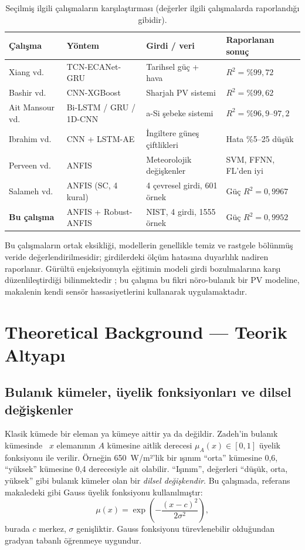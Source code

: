 \documentclass[11pt,a4paper]{article}
\begin{document}
\begin{table}[H]
\centering\small
\caption{Seçilmiş ilgili çalışmaların karşılaştırması (değerler ilgili çalışmalarda raporlandığı gibidir).}
\label{tab:related}
\begin{tabular}{@{}llll@{}}
\toprule
Çalışma & Yöntem & Girdi / veri & Raporlanan sonuç \\
\midrule
Xiang vd.~\cite{xiang2024} & TCN-ECANet-GRU & Tarihsel güç + hava & $R^2=\%99{,}72$ \\
Bashir vd.~\cite{bashir2024} & CNN-XGBoost & Sharjah PV sistemi & $R^2=\%99{,}62$ \\
Ait Mansour vd.~\cite{aitmansour2024} & Bi-LSTM / GRU / 1D-CNN & a-Si şebeke sistemi & $R^2=\%96{,}9$–$97{,}2$ \\
Ibrahim vd.~\cite{ibrahim2024} & CNN + LSTM-AE & İngiltere güneş çiftlikleri & Hata \%5–25 düşük \\
Perveen vd.~\cite{perveen2019} & ANFIS & Meteorolojik değişkenler & SVM, FFNN, FL'den iyi \\
Salameh vd.~\cite{salameh2025} & ANFIS (SC, 4 kural) & 4 çevresel girdi, 601 örnek & Güç $R^2=0{,}9967$ \\
\textbf{Bu çalışma} & ANFIS + Robust-ANFIS & NIST, 4 girdi, 1555 örnek & Güç $R^2=0{,}9952$ \\
\bottomrule
\end{tabular}
\end{table}

Bu çalışmaların ortak eksikliği, modellerin genellikle temiz ve rastgele bölünmüş veride değerlendirilmesidir; girdilerdeki ölçüm hatasına duyarlılık nadiren raporlanır. Gürültü enjeksiyonuyla eğitimin modeli girdi bozulmalarına karşı düzenlileştirdiği bilinmektedir \cite{bishop1995}; bu çalışma bu fikri nöro-bulanık bir PV modeline, makalenin kendi sensör hassasiyetlerini kullanarak uygulamaktadır.

\section{Theoretical Background — Teorik Altyapı}

\subsection{Bulanık kümeler, üyelik fonksiyonları ve dilsel değişkenler}
Klasik kümede bir eleman ya kümeye aittir ya da değildir. Zadeh'in bulanık kümesinde~\cite{zadeh1965} $x$ elemanının $A$ kümesine aitlik derecesi $\mu_A(x)\in[0,1]$ üyelik fonksiyonu ile verilir. Örneğin 650~W/m²'lik bir ışınım “orta” kümesine 0,6, “yüksek” kümesine 0,4 derecesiyle ait olabilir. “Işınım”, değerleri “düşük, orta, yüksek” gibi bulanık kümeler olan bir \emph{dilsel değişkendir}. Bu çalışmada, referans makaledeki gibi Gauss üyelik fonksiyonu kullanılmıştır:
\begin{equation}
\mu(x)=\exp\!\left(-\frac{(x-c)^2}{2\sigma^2}\right),
\label{eq:gauss}
\end{equation}
burada $c$ merkez, $\sigma$ genişliktir. Gauss fonksiyonu türevlenebilir olduğundan gradyan tabanlı öğrenmeye uygundur.
\end{document}

